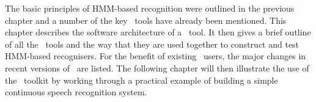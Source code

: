 %
%


The basic principles of HMM-based recognition were outlined in
the previous chapter and a number of the key \HTK\ tools have already
been mentioned.  This chapter describes the software architecture
of a \HTK\ tool.   It then gives a brief outline of all the
\HTK\ tools and the way that they are used together to construct
and test HMM-based recognisers.  For the benefit of existing \HTK\ users,
the major changes in recent versions of \HTK\ are listed.
The following chapter will then illustrate
the use of the \HTK\ toolkit 
by working through a practical example of building a simple 
continuous speech recognition system.

